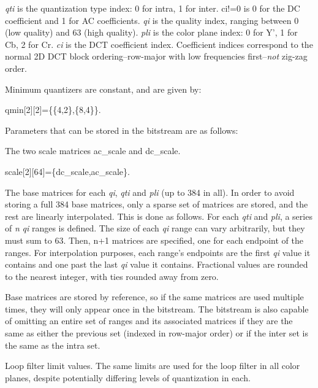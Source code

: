 {\itshape qti} is the quantization type index\-: 0 for intra, 1 for inter. {\ttfamily ci!=0} is 0 for the D\-C coefficient and 1 for A\-C coefficients. {\itshape qi} is the quality index, ranging between 0 (low quality) and 63 (high quality). {\itshape pli} is the color plane index\-: 0 for Y', 1 for Cb, 2 for Cr. {\itshape ci} is the D\-C\-T coefficient index. Coefficient indices correspond to the normal 2\-D D\-C\-T block ordering--row-\/major with low frequencies first--{\itshape not} zig-\/zag order.

Minimum quantizers are constant, and are given by\-: 
\begin{DoxyCode}
qmin[2][2]=\{\{4,2\},\{8,4\}\}.
\end{DoxyCode}


Parameters that can be stored in the bitstream are as follows\-:
\begin{DoxyItemize}
\item The two scale matrices ac\-\_\-scale and dc\-\_\-scale. 
\begin{DoxyCode}
scale[2][64]=\{dc_scale,ac_scale\}.
\end{DoxyCode}

\item The base matrices for each {\itshape qi}, {\itshape qti} and {\itshape pli} (up to 384 in all). In order to avoid storing a full 384 base matrices, only a sparse set of matrices are stored, and the rest are linearly interpolated. This is done as follows. For each {\itshape qti} and {\itshape pli}, a series of {\itshape n} {\itshape qi} ranges is defined. The size of each {\itshape qi} range can vary arbitrarily, but they must sum to 63. Then, {\ttfamily n+1} matrices are specified, one for each endpoint of the ranges. For interpolation purposes, each range's endpoints are the first {\itshape qi} value it contains and one past the last {\itshape qi} value it contains. Fractional values are rounded to the nearest integer, with ties rounded away from zero.

Base matrices are stored by reference, so if the same matrices are used multiple times, they will only appear once in the bitstream. The bitstream is also capable of omitting an entire set of ranges and its associated matrices if they are the same as either the previous set (indexed in row-\/major order) or if the inter set is the same as the intra set.
\end{DoxyItemize}


\begin{DoxyItemize}
\item Loop filter limit values. The same limits are used for the loop filter in all color planes, despite potentially differing levels of quantization in each.
\end{DoxyItemize}

